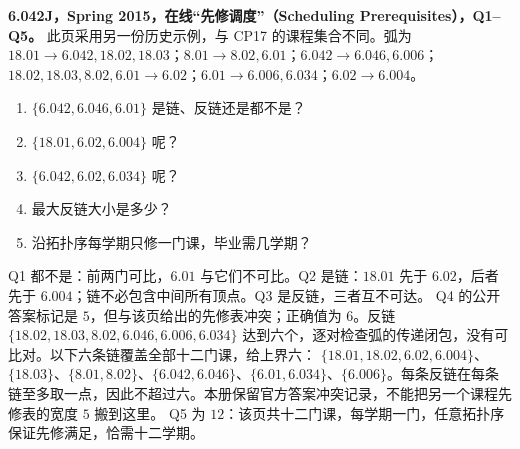 \begin{exercise}
\textbf{6.042J，Spring 2015，在线“先修调度”（Scheduling Prerequisites），Q1--Q5。}
此页采用另一份历史示例，与 CP17 的课程集合不同。弧为
$18.01\to6.042,18.02,18.03$；$8.01\to8.02,6.01$；$6.042\to6.046,6.006$；$18.02,18.03,8.02,6.01\to6.02$；$6.01\to6.006,6.034$；$6.02\to6.004$。
\begin{enumerate}[label=Q\arabic*.]
\item\label{mit:6042-online-scheduling-prerequisites-q1} $\{6.042,6.046,6.01\}$ 是链、反链还是都不是？
\item\label{mit:6042-online-scheduling-prerequisites-q2} $\{18.01,6.02,6.004\}$ 呢？
\item\label{mit:6042-online-scheduling-prerequisites-q3} $\{6.042,6.02,6.034\}$ 呢？
\item\label{mit:6042-online-scheduling-prerequisites-q4} 最大反链大小是多少？
\item\label{mit:6042-online-scheduling-prerequisites-q5} 沿拓扑序每学期只修一门课，毕业需几学期？
\end{enumerate}
\end{exercise}
\begin{solution}
Q1 都不是：前两门可比，$6.01$ 与它们不可比。Q2 是链：$18.01$ 先于 $6.02$，后者先于 $6.004$；链不必包含中间所有顶点。Q3 是反链，三者互不可达。
Q4 的公开答案标记是 $5$，但与该页给出的先修表冲突；正确值为 $6$。反链 $\{18.02,18.03,8.02,6.046,6.006,6.034\}$ 达到六个，逐对检查弧的传递闭包，没有可比对。以下六条链覆盖全部十二门课，给上界六：
$\{18.01,18.02,6.02,6.004\}$、$\{18.03\}$、$\{8.01,8.02\}$、$\{6.042,6.046\}$、$\{6.01,6.034\}$、$\{6.006\}$。每条反链在每条链至多取一点，因此不超过六。本册保留官方答案冲突记录，不能把另一个课程先修表的宽度 $5$ 搬到这里。
Q5 为 $12$：该页共十二门课，每学期一门，任意拓扑序保证先修满足，恰需十二学期。
\end{solution}

